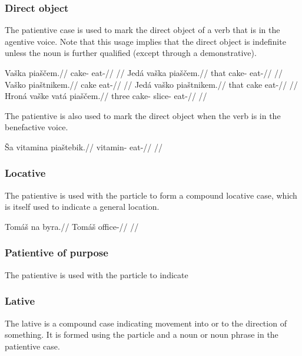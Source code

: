 \subsubsection{Direct object}
The patientive case is used to mark the direct object of a verb that is in the agentive voice. Note that this usage implies that the direct object is indefinite unless the noun is further qualified (except through a demonstrative).

\pex
\a
\begingl
\gla Vaška piaščem.//
\glb cake- eat-//
\glft {}//
\endgl
\a
\begingl
\gla Jedá vaška piaščem.//
\glb that cake- eat-//
\glft {}//
\endgl
\a
\begingl
\gla Vaško piaštnikem.//
\glb cake eat-//
\glft {}//
\endgl
\a
\begingl
\gla Jedá vaško piaštnikem.//
\glb that cake eat-//
\glft {}//
\endgl
\a
\begingl
\gla Hroná vaške vatá piaščem.//
\glb three cake- slice- eat-//
\glft {}//
\endgl
\xe

The patientive is also used to mark the direct object when the verb is in the benefactive voice.

\pex
\begingl
\gla Ša vitamina piaštebik.//
\glb {} vitamin- eat-//
\glft {}//
\endgl
\xe



\subsubsection{Locative}

The patientive is used with the particle  to form a compound locative case, which is itself used to indicate a general location.

\pex
\begingl
\gla Tomáš na byra.//
\glb Tomáš  office-//
\glft {}//
\endgl
\xe

\subsubsection{Patientive of purpose}

The patientive is used with the particle  to indicate

\subsubsection{Lative}
The lative is a compound case indicating movement into or to the direction of something. It is formed using the particle  and a noun or noun phrase in the patientive case.

